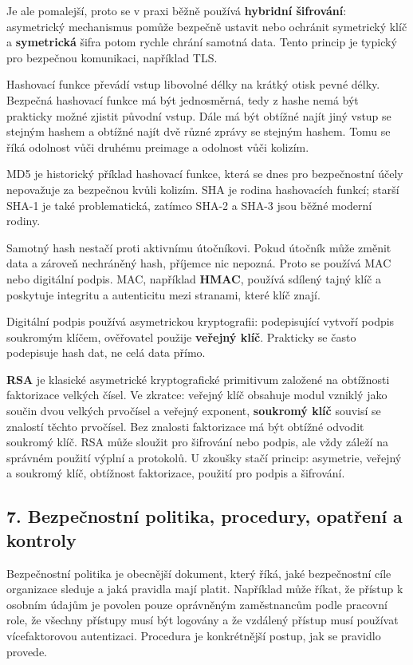 \documentclass[11pt,a4paper]{article}
\begin{document}
Je ale pomalejší, proto se v praxi běžně používá \textbf{hybridní šifrování}: asymetrický mechanismus pomůže bezpečně ustavit nebo ochránit symetrický klíč a \textbf{symetrická} šifra potom rychle chrání samotná data. Tento princip je typický pro bezpečnou komunikaci, například TLS.

Hashovací funkce převádí vstup libovolné délky na krátký otisk pevné délky. Bezpečná hashovací funkce má být jednosměrná, tedy z hashe nemá být prakticky možné zjistit původní vstup. Dále má být obtížné najít jiný vstup se stejným hashem a obtížné najít dvě různé zprávy se stejným hashem. Tomu se říká odolnost vůči druhému preimage a odolnost vůči kolizím.

MD5 je historický příklad hashovací funkce, která se dnes pro bezpečnostní účely nepovažuje za bezpečnou kvůli kolizím. SHA je rodina hashovacích funkcí; starší SHA-1 je také problematická, zatímco SHA-2 a SHA-3 jsou běžné moderní rodiny.

Samotný hash nestačí proti aktivnímu útočníkovi. Pokud útočník může změnit data a zároveň nechráněný hash, příjemce nic nepozná. Proto se používá MAC nebo digitální podpis. MAC, například \textbf{HMAC}, používá sdílený tajný klíč a poskytuje integritu a autenticitu mezi stranami, které klíč znají.

Digitální podpis používá asymetrickou kryptografii: podepisující vytvoří podpis soukromým klíčem, ověřovatel použije \textbf{veřejný klíč}. Prakticky se často podepisuje hash dat, ne celá data přímo.

\textbf{RSA} je klasické asymetrické kryptografické primitivum založené na obtížnosti faktorizace velkých čísel. Ve zkratce: veřejný klíč obsahuje modul vzniklý jako součin dvou velkých prvočísel a veřejný exponent, \textbf{soukromý klíč} souvisí se znalostí těchto prvočísel. Bez znalosti faktorizace má být obtížné odvodit soukromý klíč. RSA může sloužit pro šifrování nebo podpis, ale vždy záleží na správném použití výplní a protokolů. U zkoušky stačí princip: asymetrie, veřejný a soukromý klíč, obtížnost faktorizace, použití pro podpis a šifrování.

\subsection*{7. Bezpečnostní politika, procedury, opatření a kontroly}

Bezpečnostní politika je obecnější dokument, který říká, jaké bezpečnostní cíle organizace sleduje a jaká pravidla mají platit. Například může říkat, že přístup k osobním údajům je povolen pouze oprávněným zaměstnancům podle pracovní role, že všechny přístupy musí být logovány a že vzdálený přístup musí používat vícefaktorovou autentizaci. Procedura je konkrétnější postup, jak se pravidlo provede.
\end{document}
